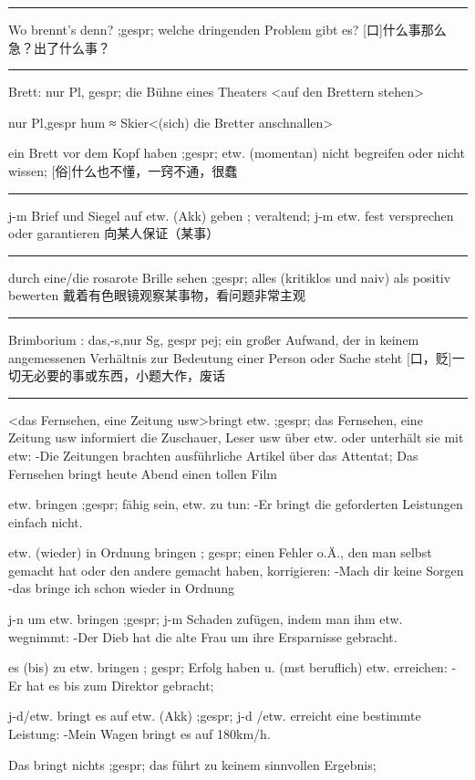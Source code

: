 \noindent\rule{\textwidth}{1pt} 
Wo brennt's denn? ;gespr; welche dringenden Problem gibt es? [口]什么事那么急？出了什么事？

\noindent\rule{\textwidth}{1pt} 
Brett: nur Pl, gespr; die Bühne eines Theaters \textless auf den Brettern stehen\textgreater  

nur Pl,gespr hum ≈ Skier\textless (sich) die Bretter anschnallen\textgreater 

ein Brett vor dem Kopf haben ;gespr; etw. (momentan) nicht begreifen oder nicht wissen; [俗]什么也不懂，一窍不通，很蠢

\noindent\rule{\textwidth}{1pt} 
j-m Brief und Siegel auf etw. (Akk) geben ; veraltend; j-m etw. fest versprechen oder garantieren 向某人保证（某事）

\noindent\rule{\textwidth}{1pt} 
durch eine/die rosarote Brille sehen ;gespr; alles (kritiklos und naiv) als positiv bewerten 戴着有色眼镜观察某事物，看问题非常主观

\noindent\rule{\textwidth}{1pt} 
Brimborium : das,-s,nur Sg, gespr pej; ein großer Aufwand, der in keinem angemessenen Verhältnis zur Bedeutung einer Person oder Sache steht [口，贬]一切无必要的事或东西，小题大作，废话

\noindent\rule{\textwidth}{1pt} 
\textless das Fernsehen, eine Zeitung usw\textgreater  bringt etw. ;gespr; das Fernsehen, eine Zeitung usw informiert die Zuschauer, Leser usw über etw. oder unterhält sie mit etw: 
-Die Zeitungen brachten ausführliche Artikel über das Attentat; Das Fernsehen bringt heute Abend einen tollen Film

etw. bringen ;gespr; fähig sein, etw. zu tun:
-Er bringt die geforderten Leistungen einfach nicht.

etw. (wieder) in Ordnung bringen ; gespr; einen Fehler o.Ä., den man selbst gemacht hat oder den andere gemacht haben, korrigieren:
-Mach dir keine Sorgen -das bringe ich schon wieder in Ordnung

j-n um etw. bringen ;gespr; j-m Schaden zufügen, indem man ihm etw. wegnimmt:
-Der Dieb hat die alte Frau um ihre Ersparnisse gebracht.

es (bis) zu etw. bringen ; gespr; Erfolg haben u. (mst beruflich) etw. erreichen:
-Er hat es bis zum Direktor gebracht;

j-d/etw. bringt es auf etw. (Akk) ;gespr; j-d /etw. erreicht eine bestimmte Leistung:
-Mein Wagen bringt es auf 180km/h.

Das bringt nichts ;gespr; das führt zu keinem sinnvollen Ergebnis;

